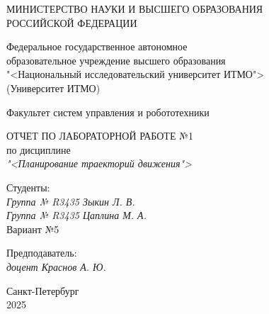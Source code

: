 \thispagestyle{empty}

\begin{center}
    МИНИСТЕРСТВО НАУКИ И ВЫСШЕГО ОБРАЗОВАНИЯ \\ РОССИЙСКОЙ ФЕДЕРАЦИИ

    \vspace{20pt}

    Федеральное государственное автономное \\ образовательное учреждение высшего образования \\
    "<Национальный исследовательский университет ИТМО"> \\
    (Университет ИТМО)

    \vspace{20pt}

    Факультет систем управления и робототехники
\end{center}

\vfill

\begin{center}
    ОТЧЕТ ПО ЛАБОРАТОРНОЙ РАБОТЕ №1\\  
    по дисциплине \\
    \textit{"<Планирование траекторий движения">}

    \vspace{20pt}

    
\end{center}

\vfill

    \noindent Студенты: \\
    \textit{Группа № R3435 \hfill Зыкин Л. В.} \\
    \textit{Группа № R3435 \hfill Цаплина М. А.} \\
    \noindent Вариант №5 \\

    \vspace{20pt}

    \noindent Предподаватель: \\
    \textit{доцент \hfill Краснов А. Ю.}

\vfill

\begin{center}
    Санкт-Петербург \\ 2025
\end{center}